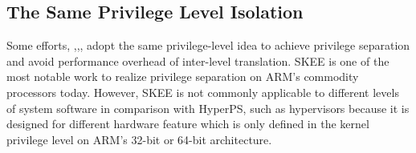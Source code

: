 \documentclass[conference]{IEEEtran}
\begin{document}
\subsection{The Same Privilege Level Isolation}
Some efforts, 
\cite{Azab2016SKEE},\cite{Wang2015SecPod},\cite{Deng2017Dancing}, adopt the same privilege-level idea to achieve privilege separation and avoid performance overhead of inter-level translation.
SKEE\cite{Azab2016SKEE} is one of the most notable work to realize privilege separation on ARM's commodity processors today. 
However, SKEE is not commonly applicable to different levels of system software in comparison with HyperPS, such as hypervisors because it is designed for different hardware feature which is only defined in the kernel privilege level on ARM's 32-bit or 64-bit architecture.
\end{document}

